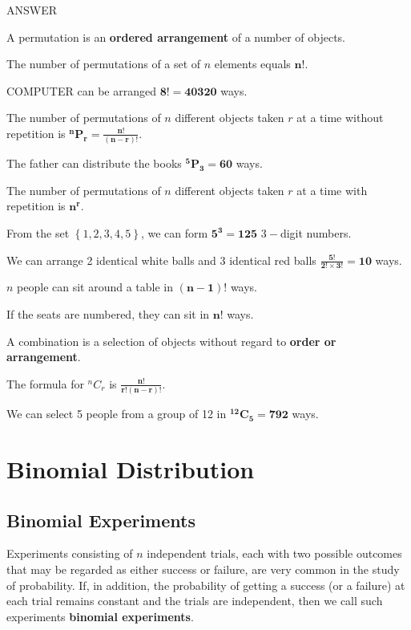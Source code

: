 \documentclass[11pt,a4paper]{book}
\begin{document}
\begin{testyourself}{ANSWER}
\begin{tasks}[label=(\alph*),label-width=3.5ex] 

\task  A permutation is an \textbf{ordered arrangement} of a number of objects.

\task  The number of permutations of a set of $n$ elements equals
$\boldsymbol{n!}$.

\task  COMPUTER can be arranged $\boldsymbol{8!=40320}$ ways.

\task  The number of permutations of $n$ different objects taken
$r$ at a time without repetition\textbf{ }is $\boldsymbol{
^{n}P_{r}=\frac{n!}{\left(n-r\right)!}}$.

\task  The father can distribute the books $\boldsymbol{^{5}P_{3}=60}$ ways.

\task  The number of permutations of $n$ different objects taken
$r$ at a time with repetition\textbf{ }is $\boldsymbol{n^{r}}$.

\task  From the set $\left\{ 1,2,3,4,5\right\}$, we can form $\boldsymbol{5^{3}=125}$ $3-$digit numbers.

\task  We can arrange 2 identical white balls and 3 identical red balls $\boldsymbol{\frac{5!}{2!\times3!}=10}$ ways.

\task  $n$ people can sit around a table in $\boldsymbol{(n-1)!}$ ways.

\task  If the seats are numbered, they can sit in $\boldsymbol{n!}$ ways.

\task  A combination is a selection of objects without regard to
 \textbf{order or arrangement}.

\task  The formula for $^{n}C_{r}$ is $\boldsymbol{\frac{n!}{r!\left(n-r\right)!}}$.

\task We can select 5 people from a group of 12 in  $\boldsymbol{^{12}C_{5}=792}$ ways.

\end{tasks}
\end{testyourself}


\chapter{Binomial Distribution}

\section{Binomial Experiments}

Experiments consisting of $n$ independent trials, each with two possible outcomes that may be regarded as either success or failure, are very common in the study of probability. If, in addition, the probability of getting a success (or a failure) at each trial remains constant and the trials are independent, then we call such experiments \textbf{binomial experiments}.
\end{document}
